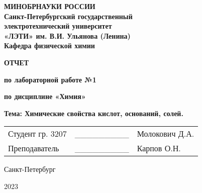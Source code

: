 \begin{titlepage}
    \begin{center}
        \LARGE
        \textbf{МИНОБРНАУКИ РОССИИ} \\
        \textbf{Санкт-Петербургский государственный} \\
        \textbf{электротехнический университет} \\
        \textbf{«ЛЭТИ» им. В.И. Ульянова (Ленина)} \\
        
        \vspace{0.5cm}
        \Large
        \textbf{Кафедра физической химии}

        \vspace{5cm}
        \Large
        \textbf{ОТЧЕТ}

        \textbf{по лабораторной работе №1}

        \textbf{по дисциплине «Химия»}

        \textbf{Тема: Химические свойства кислот, оснований, солей.}


        \mbox{}
        \vfill

        \begin{tabular}{l c l}
            Студент гр. 3207 & \_\_\_\_\_\_\_\_\_ & Молокович Д.А. \\ 
            Преподаватель & \_\_\_\_\_\_\_\_\_ & Карпов О.Н. \\ 
        \end{tabular}

        \vspace{1cm}

        Санкт-Петербург

        2023
    \end{center}
\end{titlepage}
\addtocounter{page}{1}
